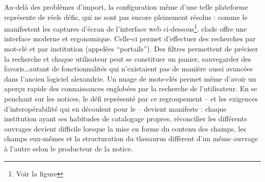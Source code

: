 Au-delà des problèmes d'import, la configuration même d'une telle plateforme représente de réels défis, qui ne sont pas encore pleinement résolus : comme le manifestent les captures d'écran de l'interface web ci-dessous\footnote{Voir la figure }, \gls{clade} offre une interface moderne et ergonomique. Celle-ci permet d'effectuer des recherches par mot-clé et par institution (appelées \enquote{portails}). Des filtres permettent de préciser la recherche et chaque utilisateur peut se constituer un panier, sauvegarder des favoris\dots autant de fonctionnalités qui n'existaient pas de manière aussi avancées dans l'ancien logiciel \gls{alexandrie}. Un nuage de mots-clés permet même d'avoir un aperçu rapide des connaissances englobées par la recherche de l'utilisateur. En se penchant sur les notices, le défi représenté par ce regroupement -- et les exigences d'interopérabilité qui en découlent pour le \mae -- devient manifeste : chaque institution ayant ses habitudes de catalogage propres, réconcilier les différents ouvrages devient difficile lorsque la mise en forme du contenu des champs, les champs eux-mêmes et la structuration du \gls{thesaurus} diffèrent d'un même ouvrage à l'autre selon le producteur de la notice.


